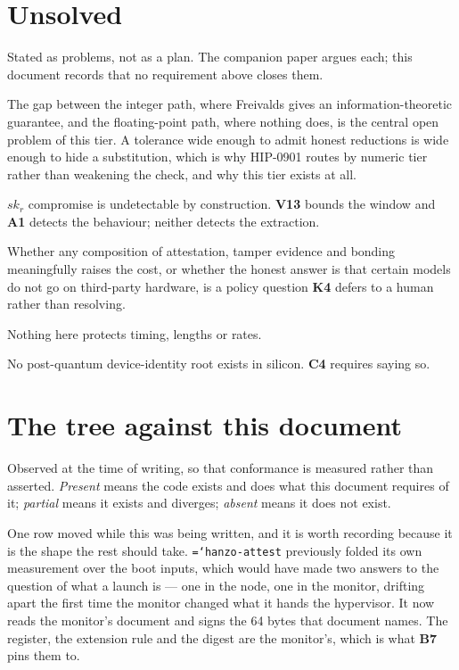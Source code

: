 \documentclass[11pt,a4paper]{article}
\newcommand{\code}[1]{\texttt{\hyphenchar\font=`\-\relax #1}}
\newcommand{\req}[1]{\textbf{#1}}
\begin{document}
\section{Unsolved}
\label{sec:open}

Stated as problems, not as a plan. The companion paper \cite{paper} argues each; this
document records that no requirement above closes them.

\begin{description}[leftmargin=1.4em]
\item[Execution integrity in floating point.] The gap between the integer path,
where Freivalds gives an information-theoretic guarantee, and the floating-point
path, where nothing does, is the central open problem of this tier. A tolerance wide
enough to admit honest reductions is wide enough to hide a substitution, which is
why HIP-0901 routes by numeric tier rather than weakening the check, and why this
tier exists at all.
\item[Detecting key extraction.] $sk_r$ compromise is undetectable by construction.
\req{V13} bounds the window and \req{A1} detects the behaviour; neither detects the
extraction.
\item[Physical attack by the party being attested.] Whether any composition of
attestation, tamper evidence and bonding meaningfully raises the cost, or whether the
honest answer is that certain models do not go on third-party hardware, is a policy
question \req{K4} defers to a human rather than resolving.
\item[Metadata.] Nothing here protects timing, lengths or rates.
\item[Post-quantum attestation.] No post-quantum device-identity root exists in
silicon. \req{C4} requires saying so.
\end{description}

\appendix
\section{The tree against this document}
\label{app:tree}

Observed at the time of writing, so that conformance is measured rather than
asserted. \emph{Present} means the code exists and does what this document requires
of it; \emph{partial} means it exists and diverges; \emph{absent} means it does not
exist.

One row moved while this was being written, and it is worth recording because it is
the shape the rest should take. \code{hanzo-attest} previously folded its own
measurement over the boot inputs, which would have made two answers to the question
of what a launch is --- one in the node, one in the monitor, drifting apart the first
time the monitor changed what it hands the hypervisor. It now reads the monitor's
document and signs the 64 bytes that document names. The register, the extension rule
and the digest are the monitor's, which is what \req{B7} pins them to.
\end{document}
